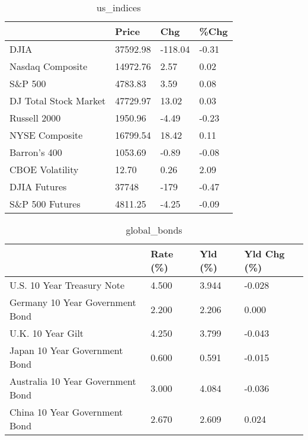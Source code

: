 \documentclass{article}%
\begin{document}
%


\begin{table}[htbp]%
\caption{us\_indices}%
\centering%
\begin{adjustbox}{width=1\textwidth}%
\begin{tabular}{llll}
\toprule
                      &    Price &     Chg &  \%Chg \\
\midrule
                 DJIA & 37592.98 & -118.04 & -0.31 \\
     Nasdaq Composite & 14972.76 &    2.57 &  0.02 \\
              S\&P 500 &  4783.83 &    3.59 &  0.08 \\
DJ Total Stock Market & 47729.97 &   13.02 &  0.03 \\
         Russell 2000 &  1950.96 &   -4.49 & -0.23 \\
       NYSE Composite & 16799.54 &   18.42 &  0.11 \\
         Barron's 400 &  1053.69 &   -0.89 & -0.08 \\
      CBOE Volatility &    12.70 &    0.26 &  2.09 \\
         DJIA Futures &    37748 &    -179 & -0.47 \\
      S\&P 500 Futures &  4811.25 &   -4.25 & -0.09 \\
\bottomrule
\end{tabular}
%
\end{adjustbox}%
\end{table}

%


\begin{table}[htbp]%
\caption{global\_bonds}%
\centering%
\begin{adjustbox}{width=1\textwidth}%
\begin{tabular}{llll}
\toprule
                                  & Rate (\%) & Yld (\%) & Yld Chg (\%) \\
\midrule
       U.S. 10 Year Treasury Note &    4.500 &   3.944 &      -0.028 \\
  Germany 10 Year Government Bond &    2.200 &   2.206 &       0.000 \\
                U.K. 10 Year Gilt &    4.250 &   3.799 &      -0.043 \\
    Japan 10 Year Government Bond &    0.600 &   0.591 &      -0.015 \\
Australia 10 Year Government Bond &    3.000 &   4.084 &      -0.036 \\
    China 10 Year Government Bond &    2.670 &   2.609 &       0.024 \\
\bottomrule
\end{tabular}
%
\end{adjustbox}%
\end{table}
\end{document}
